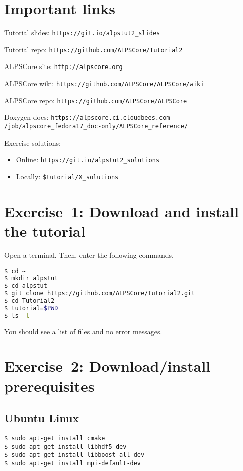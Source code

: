 \documentclass[12pt]{article}
\newcommand{\code}[1]{\texttt{#1}}
\begin{document}
\section*{Important links}
\begin{flushleft}
Tutorial slides: \nolinkurl{https://git.io/alpstut2_slides}

Tutorial repo: \nolinkurl{https://github.com/ALPSCore/Tutorial2}

ALPSCore site: \nolinkurl{http://alpscore.org}

ALPSCore wiki: \nolinkurl{https://github.com/ALPSCore/ALPSCore/wiki}

ALPSCore repo: \nolinkurl{https://github.com/ALPSCore/ALPSCore}

Doxygen docs: \nolinkurl{https://alpscore.ci.cloudbees.com}
              \nolinkurl{/job/alpscore_fedora17_doc-only/ALPSCore_reference/}

Exercise solutions:
\begin{itemize}
\item Online: \nolinkurl{https://git.io/alpstut2_solutions}
\item Locally: \code{\color{ballblue}\$tutorial/X\_solutions}
\end{itemize}

\end{flushleft}

\pagebreak

\section*{Exercise~1: Download and install the tutorial}

Open a terminal. Then, enter the following commands.

\begin{lstlisting}[language=sh,emph={ls,cd,mkdir,git}]
$ cd ~
$ mkdir alpstut
$ cd alpstut
$ git clone https://github.com/ALPSCore/Tutorial2.git
$ cd Tutorial2
$ tutorial=$PWD
$ ls -l
\end{lstlisting}

You should see a list of files and no error messages.

\section*{Exercise~2: Download/install prerequisites}
\subsection*{Ubuntu Linux}
\begin{lstlisting}[emph={sudo,apt,get}]
$ sudo apt-get install cmake
$ sudo apt-get install libhdf5-dev
$ sudo apt-get install libboost-all-dev
$ sudo apt-get install mpi-default-dev
\end{lstlisting}%
\end{document}
